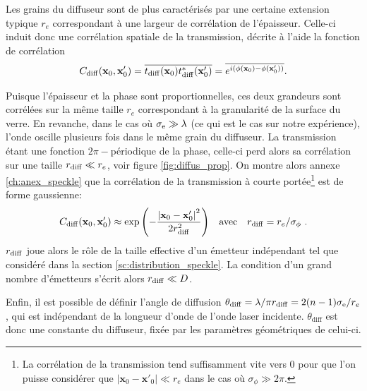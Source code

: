 Les grains du diffuseur sont de plus caractérisés par une certaine extension typique $r_e$ correspondant à une largeur de corrélation de l'épaisseur. Celle-ci induit donc une corrélation spatiale de la transmission, décrite à l'aide la fonction de corrélation
\begin{equation}
C_{\mathrm{diff}}(\mathbf{x}_0,\mathbf{x}'_0)=\overline{t_{\mathrm{diff}}(\mathbf{x}_0)t_{\mathrm{diff}}^*(\mathbf{x}'_0)}=\overline{e^{i(\phi(\mathbf{x}_0)-\phi(\mathbf{x}'_0))}} { .}
\label{eq:correlation_diffuseur}
\end{equation}

Puisque l'épaisseur et la phase sont proportionnelles, ces deux grandeurs sont corrélées sur la même taille $r_e$ correspondant à la granularité de la surface du verre. En revanche, dans le cas où $\sigma_{\mathrm{e}} \gg \lambda$ (ce qui est le cas sur notre expérience), l'onde oscille plusieurs fois dans le même grain du diffuseur. La transmission étant une fonction $2\pi-$périodique de la phase, celle-ci perd alors sa corrélation sur une taille $r_{\mathrm{diff}} \ll r_e$, voir figure \ref{fig:diffus_prop}. On montre alors annexe \ref{ch:anex_speckle} que la corrélation de la transmission à courte portée\footnote{La corrélation de la transmission tend suffisamment vite vers 0 pour que l'on puisse considérer que $\left|\mathbf{x}_0-\mathbf{x}'_0 \right| \ll r_e$ dans le cas où $\sigma_\phi \gg 2\pi$.} est de forme gaussienne:
\begin{equation}
C_{\mathrm{diff}}(\mathbf{x}_0,\mathbf{x}'_0)\approx \exp{\left( -\frac{\left| \mathbf{x}_0 - \mathbf{x}'_0 \right| ^2}{2 r_{\mathrm{diff}}^2}\right) } \quad \text{avec} \quad r_{\mathrm{diff}}=r_e/\sigma_\phi \text{ .}
\end{equation}
$r_{\mathrm{diff}}$ joue alors le rôle de la taille effective d'un émetteur indépendant tel que considéré dans la section \ref{sc:distribution_speckle}. La condition d'un grand nombre d'émetteurs s'écrit alors $r_{\mathrm{diff}} \ll D$.

Enfin, il est possible de définir l'angle de diffusion $\theta_{\mathrm{diff}}=\lambda/\pi r_{\mathrm{diff}}=2(n-1) \sigma_{\mathrm{e}}/r_e$, qui est indépendant de la longueur d'onde de l'onde laser incidente. $\theta_{\mathrm{diff}}$ est donc une constante du diffuseur, fixée par les paramètres géométriques de celui-ci.










